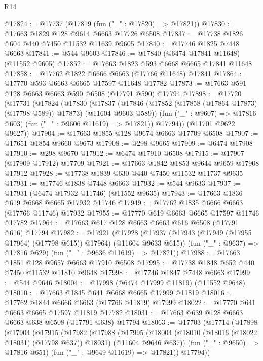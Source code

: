 \begin{lexlean}{R14}
\begin{coremodule}
{{{{{{{{{{{{{{{{{{{{{{{{{{{{{{{{{{{{{{{{{{{{{{{{{{{{{{{{{{{{{{{{{{{{{{{{{{{{{{{{{{@17824 := @17737 (@17819 (fun ("_" : @17820) => @17821))
@17830 := @17663 @1829 @128 @9614 @6663 @17726 @6508
@17837 := @17738 @1826 @604 @440 @7450 @11532 @11639 @9605
@17840 := @17746 @1825 @7448 @6663
@17841 := @544 @9603
@17846 := @17840 (@6474 @17841 @11648) (@11552 @9605)
@17852 := @17663 @1823 @593 @6668 @6665 @17841 @11648
@17858 := @17762 @1822 @6666 @6663 (@17766 @11648) @17841
@17864 := @17770 @593 @6663 @6665 @17597 @11648 @17782
@17873 := @17663 @591 @128 @6663 @6663 @590 @6508 (@17791 @590) @17794
@17898 := @17720
    (@17731
      (@17824
        (@17830
          (@17837
            (@17846 (@17852 (@17858 (@17864 @17873) (@17798 @589)) @17873) (@11604 @9603 @589))
            (fun ("_" : @9607) => @17816 @603)
            (fun ("_" : @9606 @11619) => @17821))
          @17794))
      (@11701 @9622 @9627))
@17904 := @17663 @1855 @128 @9674 @6663 @17709 @6508
@17907 := @17651 @1854 @9660 @9673
@17908 := @298 @9665
@17909 := @6474 @17908
@17910 := @298 @9670
@17912 := @6474 @17910 @6508
@17915 := @17907 (@17909 @17912) @17709
@17921 := @17663 @1842 @1853 @9644 @9659 @17908 @17912
@17928 := @17738 @1839 @630 @440 @7450 @11532 @11737 @9635
@17931 := @17746 @1838 @7448 @6663
@17932 := @544 @9633
@17937 := @17931 (@6474 @17932 @11746) (@11552 @9635)
@17943 := @17663 @1836 @619 @6668 @6665 @17932 @11746
@17949 := @17762 @1835 @6666 @6663 (@17766 @11746) @17932
@17955 := @17770 @619 @6663 @6665 @17597 @11746 @17782
@17964 := @17663 @617 @128 @6663 @6663 @616 @6508 (@17791 @616) @17794
@17982 := @17921
    (@17928
      (@17937 (@17943 (@17949 (@17955 @17964) (@17798 @615)) @17964) (@11604 @9633 @615))
      (fun ("_" : @9637) => @17816 @629)
      (fun ("_" : @9636 @11619) => @17821))
@17988 := @17663 @1851 @128 @9657 @6663 @17910 @6508
@17995 := @17738 @1848 @652 @440 @7450 @11532 @11810 @9648
@17998 := @17746 @1847 @7448 @6663
@17999 := @544 @9646
@18004 := @17998 (@6474 @17999 @11819) (@11552 @9648)
@18010 := @17663 @1845 @641 @6668 @6665 @17999 @11819
@18016 := @17762 @1844 @6666 @6663 (@17766 @11819) @17999
@18022 := @17770 @641 @6663 @6665 @17597 @11819 @17782
@18031 := @17663 @639 @128 @6663 @6663 @638 @6508 (@17791 @638) @17794
@18063 := @17703
    (@17714
      (@17898
        (@17904
          (@17915
            (@17982
              (@17988
                (@17995
                  (@18004
                    (@18010 (@18016 (@18022 @18031) (@17798 @637)) @18031)
                    (@11604 @9646 @637))
                  (fun ("_" : @9650) => @17816 @651)
                  (fun ("_" : @9649 @11619) => @17821))
                @17794))
}}}}}}}}}}}}}}}}}}}}}}}}}}}}}}}}}}}}}}}}}}}}}}}}}}}}}}}}}}}}}}}}}}}}}}}}}}}}}}}}}}
\end{coremodule}
\end{lexlean}
